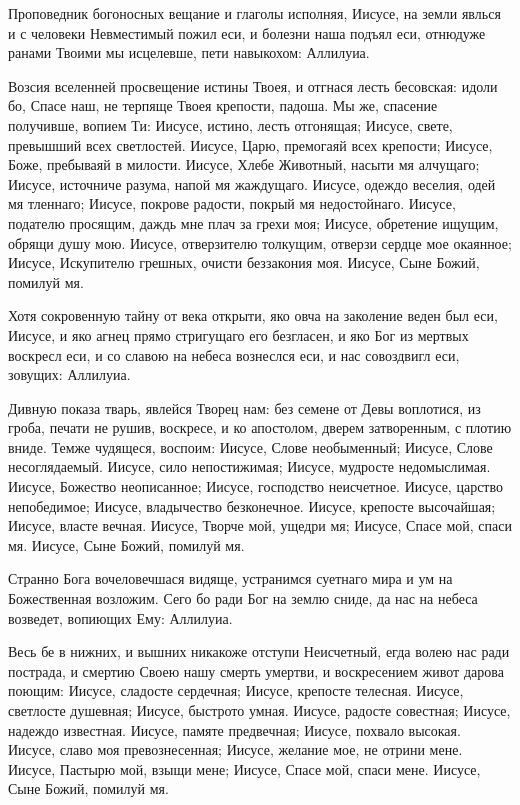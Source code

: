 \begin{mymulticols}

Проповедник
богоносных вещание и глаголы исполняя, Иисусе, на земли явлься и с человеки Невместимый пожил еси, и болезни наша подъял еси, отнюдуже ранами Твоими мы исцелевше, пети навыкохом: Аллилуиа.


Возсия
вселенней просвещение истины Твоея, и отгнася лесть бесовская: идоли бо, Спасе наш, не терпяще Твоея крепости, падоша. Мы же, спасение получивше, вопием Ти: Иисусе, истино, лесть отгонящая; Иисусе, свете, превышший всех светлостей. Иисусе, Царю, премогаяй всех крепости; Иисусе, Боже, пребываяй в милости. Иисусе, Хлебе Животный, насыти мя алчущаго; Иисусе, источниче разума, напой мя жаждущаго. Иисусе, одеждо веселия, одей мя тленнаго; Иисусе, покрове радости, покрый мя недостойнаго. Иисусе, подателю просящим, даждь мне плач за грехи моя; Иисусе, обретение ищущим, обрящи душу мою. Иисусе, отверзителю толкущим, отверзи сердце мое окаянное; Иисусе, Искупителю грешных, очисти беззакония моя. Иисусе, Сыне Божий, помилуй мя.


Хотя
сокровенную тайну от века открыти, яко овча на заколение веден был еси, Иисусе, и яко агнец прямо стригущаго его безгласен, и яко Бог из мертвых воскресл еси, и со славою на небеса вознеслся еси, и нас совоздвигл еси, зовущих: Аллилуиа.


Дивную
показа тварь, явлейся Творец нам: без семене от Девы воплотися, из гроба, печати не рушив, воскресе, и ко апостолом, дверем затворенным, с плотию вниде. Темже чудящеся, воспоим: Иисусе, Слове необыменный; Иисусе, Слове несоглядаемый. Иисусе, сило непостижимая; Иисусе,
мудросте недомыслимая. Иисусе, Божество неописанное; Иисусе, господство неисчетное. Иисусе, царство непобедимое; Иисусе, владычество безконечное. Иисусе, крепосте высочайшая; Иисусе, власте вечная. Иисусе, Творче мой, ущедри мя; Иисусе, Спасе мой, спаси мя. Иисусе, Сыне Божий, помилуй мя.


Странно
Бога вочеловечшася видяще, устранимся суетнаго мира и ум на Божественная возложим. Сего бо ради Бог на землю сниде, да нас на небеса возведет, вопиющих Ему: Аллилуиа.


Весь
бе в нижних, и вышних никакоже отступи Неисчетный, егда волею нас ради пострада, и смертию Своею нашу смерть умертви, и воскресением живот дарова поющим: Иисусе, сладосте сердечная; Иисусе, крепосте телесная. Иисусе, светлосте душевная; Иисусе, быстрото умная. Иисусе, радосте совестная; Иисусе, надеждо известная. Иисусе, памяте предвечная; Иисусе, похвало высокая. Иисусе, славо моя превознесенная; Иисусе, желание мое, не отрини мене. Иисусе, Пастырю мой, взыщи мене; Иисусе, Спасе мой, спаси мене. Иисусе, Сыне Божий, помилуй мя.


\end{mymulticols}
